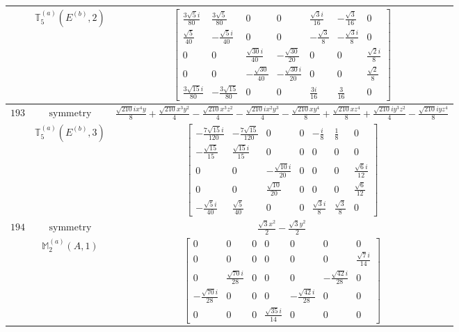 \documentclass[fleqn,8pt,landscape]{jsarticle}
\begin{document}
\begin{longtable}{ccc}
$  $ & $ \mathbb{T}_{5}^{(a)}(E^{(b)},2) $ & $ \begin{bmatrix} \frac{3 \sqrt{5} i}{80} & \frac{3 \sqrt{5}}{80} & 0 & 0 & \frac{\sqrt{3} i}{16} & - \frac{\sqrt{3}}{16} & 0 \\ \frac{\sqrt{5}}{40} & - \frac{\sqrt{5} i}{40} & 0 & 0 & - \frac{\sqrt{3}}{8} & - \frac{\sqrt{3} i}{8} & 0 \\ 0 & 0 & \frac{\sqrt{30} i}{40} & - \frac{\sqrt{30}}{20} & 0 & 0 & \frac{\sqrt{2} i}{8} \\ 0 & 0 & - \frac{\sqrt{30}}{40} & - \frac{\sqrt{30} i}{20} & 0 & 0 & \frac{\sqrt{2}}{8} \\ \frac{3 \sqrt{15} i}{80} & - \frac{3 \sqrt{15}}{80} & 0 & 0 & \frac{3 i}{16} & \frac{3}{16} & 0 \end{bmatrix} $ \\ \hline
$ 193 $ & $ \text{symmetry} $ & $ \frac{\sqrt{210} i x^{4} y}{8} + \frac{\sqrt{210} x^{3} y^{2}}{4} - \frac{\sqrt{210} x^{3} z^{2}}{4} - \frac{\sqrt{210} i x^{2} y^{3}}{4} - \frac{\sqrt{210} x y^{4}}{8} + \frac{\sqrt{210} x z^{4}}{8} + \frac{\sqrt{210} i y^{3} z^{2}}{4} - \frac{\sqrt{210} i y z^{4}}{8} $ \\
$  $ & $ \mathbb{T}_{5}^{(a)}(E^{(b)},3) $ & $ \begin{bmatrix} - \frac{7 \sqrt{15} i}{120} & - \frac{7 \sqrt{15}}{120} & 0 & 0 & - \frac{i}{8} & \frac{1}{8} & 0 \\ - \frac{\sqrt{15}}{15} & \frac{\sqrt{15} i}{15} & 0 & 0 & 0 & 0 & 0 \\ 0 & 0 & - \frac{\sqrt{10} i}{20} & 0 & 0 & 0 & \frac{\sqrt{6} i}{12} \\ 0 & 0 & \frac{\sqrt{10}}{20} & 0 & 0 & 0 & \frac{\sqrt{6}}{12} \\ - \frac{\sqrt{5} i}{40} & \frac{\sqrt{5}}{40} & 0 & 0 & \frac{\sqrt{3} i}{8} & \frac{\sqrt{3}}{8} & 0 \end{bmatrix} $ \\ \hline
$ 194 $ & $ \text{symmetry} $ & $ \frac{\sqrt{3} x^{2}}{2} - \frac{\sqrt{3} y^{2}}{2} $ \\
$  $ & $ \mathbb{M}_{2}^{(a)}(A,1) $ & $ \begin{bmatrix} 0 & 0 & 0 & 0 & 0 & 0 & 0 \\ 0 & 0 & 0 & 0 & 0 & 0 & \frac{\sqrt{7} i}{14} \\ 0 & \frac{\sqrt{70} i}{28} & 0 & 0 & 0 & - \frac{\sqrt{42} i}{28} & 0 \\ - \frac{\sqrt{70} i}{28} & 0 & 0 & 0 & - \frac{\sqrt{42} i}{28} & 0 & 0 \\ 0 & 0 & 0 & \frac{\sqrt{35} i}{14} & 0 & 0 & 0 \end{bmatrix} $ \\ \hline

\end{longtable}
\end{document}
